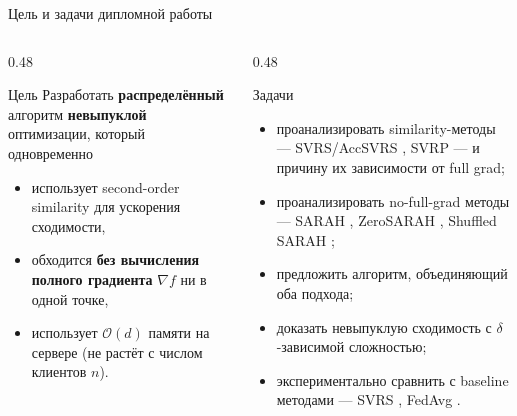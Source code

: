 \documentclass[10pt,aspectratio=169,t]{beamer}
\begin{document}
\begin{frame}{Цель и задачи дипломной работы}
\begin{columns}[T,onlytextwidth]
\begin{column}{0.48\textwidth}
\begin{block}{Цель}
Разработать \textbf{распределённый} алгоритм \textbf{невыпуклой} оптимизации, который одновременно
\begin{itemize}
  \item использует second-order similarity для ускорения сходимости,
  \item обходится \textbf{без вычисления полного градиента} $\nabla f$ ни в одной точке,
  \item использует $\mathcal{O}(d)$ памяти на сервере (не растёт с числом клиентов $n$).
\end{itemize}
\end{block}
\end{column}

\begin{column}{0.48\textwidth}
\begin{block}{Задачи}
\begin{itemize}
  \item проанализировать similarity-методы — SVRS/AccSVRS \citep{lin2023stochastic}, SVRP \citep{khaled2022faster} — и причину их зависимости от full grad;
  \item проанализировать no-full-grad методы — SARAH \citep{nguyen2017sarah}, ZeroSARAH \citep{li2021zerosarah}, Shuffled SARAH \citep{beznosikov2024random};
  \item предложить алгоритм, объединяющий оба подхода;
  \item доказать невыпуклую сходимость с $\delta$-зависимой сложностью;
  \item экспериментально сравнить с baseline методами — SVRS \citep{lin2023stochastic}, FedAvg \citep{mcmahan2017communication}.
\end{itemize}
\end{block}
\end{column}
\end{columns}
\end{frame}
\end{document}
